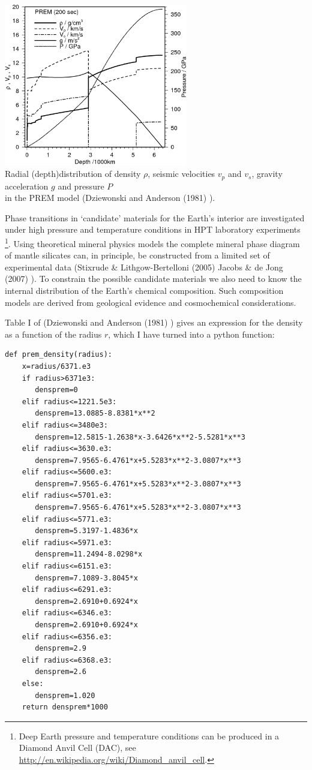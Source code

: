 \begin{center}
\includegraphics[width=8cm]{images/gravity/PREM-inc-pressure}\\
{\captionfont Radial (depth)distribution of density $\rho$, 
seismic velocities $v_p$ and $v_s$,
gravity acceleration $g$ and pressure $P$ \\
in the PREM model (Dziewonski and Anderson (1981) \cite{dzan81}).}
\end{center}


Phase transitions in `candidate' materials for the Earth's interior
are investigated under high pressure and temperature conditions in
HPT laboratory experiments
\footnote{
Deep Earth pressure and temperature conditions can be produced in 
a Diamond Anvil Cell (DAC),
see \url{http://en.wikipedia.org/wiki/Diamond\_anvil\_cell}.
}.
Using theoretical mineral physics models the complete mineral phase 
diagram of mantle silicates can, in principle,
be constructed from a limited set of experimental data
(Stixrude \& Lithgow-Bertelloni (2005) \cite{stli05,stli05b}
Jacobs \& de Jong (2007) \cite{jade07}).  
To constrain the possible candidate materials we also need to know 
the internal distribution of the Earth's chemical composition.
Such composition models are derived from geological evidence and
cosmochemical considerations.


Table I of (Dziewonski and Anderson (1981) \cite{dzan81}) gives 
an expression for the density as a function of the radius $r$, which 
I have turned into a python function:
\begin{lstlisting}
def prem_density(radius):
    x=radius/6371.e3
    if radius>6371e3:
       densprem=0
    elif radius<=1221.5e3:
       densprem=13.0885-8.8381*x**2
    elif radius<=3480e3:
       densprem=12.5815-1.2638*x-3.6426*x**2-5.5281*x**3
    elif radius<=3630.e3:
       densprem=7.9565-6.4761*x+5.5283*x**2-3.0807*x**3
    elif radius<=5600.e3:
       densprem=7.9565-6.4761*x+5.5283*x**2-3.0807*x**3
    elif radius<=5701.e3:
       densprem=7.9565-6.4761*x+5.5283*x**2-3.0807*x**3
    elif radius<=5771.e3:
       densprem=5.3197-1.4836*x
    elif radius<=5971.e3:
       densprem=11.2494-8.0298*x
    elif radius<=6151.e3:
       densprem=7.1089-3.8045*x
    elif radius<=6291.e3:
       densprem=2.6910+0.6924*x
    elif radius<=6346.e3:
       densprem=2.6910+0.6924*x
    elif radius<=6356.e3:
       densprem=2.9
    elif radius<=6368.e3:
       densprem=2.6
    else:
       densprem=1.020
    return densprem*1000
\end{lstlisting}

